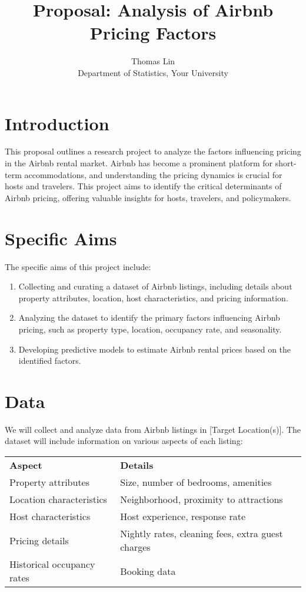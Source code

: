 \documentclass[12pt, letterpaper]{article}
\begin{document}
\title{Proposal: Analysis of Airbnb Pricing Factors}
\author{Thomas Lin\\
Department of Statistics, Your University}
\maketitle

\section*{Introduction}
This proposal outlines a research project to analyze the factors influencing pricing in the Airbnb rental market. Airbnb has become a prominent platform for short-term accommodations, and understanding the pricing dynamics is crucial for hosts and travelers. This project aims to identify the critical determinants of Airbnb pricing, offering valuable insights for hosts, travelers, and policymakers.

\section*{Specific Aims}
The specific aims of this project include:
\begin{enumerate}
  \item Collecting and curating a dataset of Airbnb listings, including details about property attributes, location, host characteristics, and pricing information.
  \item Analyzing the dataset to identify the primary factors influencing Airbnb pricing, such as property type, location, occupancy rate, and seasonality.
  \item Developing predictive models to estimate Airbnb rental prices based on the identified factors.
\end{enumerate}

\section*{Data}
We will collect and analyze data from Airbnb listings in [Target Location(s)]. The dataset will include information on various aspects of each listing:

\begin{center}
\begin{tabular}{lp{8cm}}
\textbf{Aspect} & \textbf{Details} \\
Property attributes & Size, number of bedrooms, amenities \\
Location characteristics & Neighborhood, proximity to attractions \\
Host characteristics & Host experience, response rate \\
Pricing details & Nightly rates, cleaning fees, extra guest charges \\
Historical occupancy rates & Booking data \\
\end{tabular}
\end{center}
\end{document}

